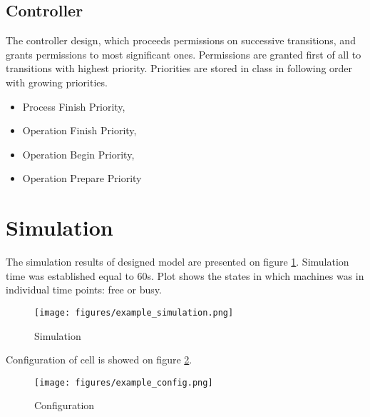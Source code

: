 		
\subsection{Controller}
The controller design, which proceeds permissions on successive transitions, and grants permissions to most significant ones. Permissions are granted first of all to transitions with highest priority. Priorities are stored in class in following order with growing priorities.

\begin{itemize}
\item Process Finish Priority,
\item Operation Finish Priority,
\item Operation Begin Priority,
\item Operation Prepare Priority
\end{itemize}
		
\section{Simulation}
The simulation results of designed model are presented on figure \ref{example_simulation}. Simulation time was established equal to 60s. Plot shows the states in which machines was in individual time points: free or busy.
		
		\begin{figure}[!tp]
		\centering
		\texttt{[image: figures/example\_simulation.png]}
		\caption{Simulation \label{example_simulation}}
		\end{figure}			
		
Configuration of cell is showed on figure \ref{example_config}.	
				
		\begin{figure}[!tp]
		\centering
		\texttt{[image: figures/example\_config.png]}
		\caption{Configuration \label{example_config}}
		\end{figure}			
		

